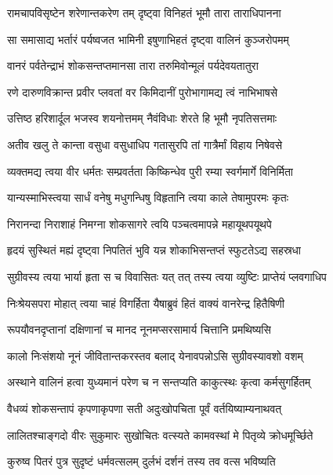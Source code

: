 
\twolineshloka
{रामचापविसृष्टेन शरेणान्तकरेण तम्}
{दृष्ट्वा विनिहतं भूमौ तारा ताराधिपानना} %

\twolineshloka
{सा समासाद्य भर्तारं पर्यष्वजत भामिनी}
{इषुणाभिहतं दृष्ट्वा वालिनं कुञ्जरोपमम्} %

\twolineshloka
{वानरं पर्वतेन्द्राभं शोकसन्तप्तमानसा}
{तारा तरुमिवोन्मूलं पर्यदेवयतातुरा} %

\twolineshloka
{रणे दारुणविक्रान्त प्रवीर प्लवतां वर}
{किमिदानीं पुरोभागामद्य त्वं नाभिभाषसे} %

\twolineshloka
{उत्तिष्ठ हरिशार्दूल भजस्व शयनोत्तमम्}
{नैवंविधाः शेरते हि भूमौ नृपतिसत्तमाः} %

\twolineshloka
{अतीव खलु ते कान्ता वसुधा वसुधाधिप}
{गतासुरपि तां गात्रैर्मां विहाय निषेवसे} %

\twolineshloka
{व्यक्तमद्य त्वया वीर धर्मतः सम्प्रवर्तता}
{किष्किन्धेव पुरी रम्या स्वर्गमार्गे विनिर्मिता} %

\twolineshloka
{यान्यस्माभिस्त्वया सार्धं वनेषु मधुगन्धिषु}
{विहृतानि त्वया काले तेषामुपरमः कृतः} %

\twolineshloka
{निरानन्दा निराशाहं निमग्ना शोकसागरे}
{त्वयि पञ्चत्वमापन्ने महायूथपयूथपे} %

\twolineshloka
{हृदयं सुस्थितं मह्यं दृष्ट्वा निपतितं भुवि}
{यन्न शोकाभिसन्तप्तं स्फुटतेऽद्य सहस्रधा} %

\twolineshloka
{सुग्रीवस्य त्वया भार्या हृता स च विवासितः}
{यत् तत् तस्य त्वया व्युष्टिः प्राप्तेयं प्लवगाधिप} %

\twolineshloka
{निःश्रेयसपरा मोहात् त्वया चाहं विगर्हिता}
{यैषाब्रुवं हितं वाक्यं वानरेन्द्र हितैषिणी} %

\twolineshloka
{रूपयौवनदृप्तानां दक्षिणानां च मानद}
{नूनमप्सरसामार्य चित्तानि प्रमथिष्यसि} %

\twolineshloka
{कालो निःसंशयो नूनं जीवितान्तकरस्तव}
{बलाद् येनावपन्नोऽसि सुग्रीवस्यावशो वशम्} %

\twolineshloka
{अस्थाने वालिनं हत्वा युध्यमानं परेण च}
{न सन्तप्यति काकुत्स्थः कृत्वा कर्मसुगर्हितम्} %

\twolineshloka
{वैधव्यं शोकसन्तापं कृपणाकृपणा सती}
{अदुःखोपचिता पूर्वं वर्तयिष्याम्यनाथवत्} %

\twolineshloka
{लालितश्चाङ्गदो वीरः सुकुमारः सुखोचितः}
{वत्स्यते कामवस्थां मे पितृव्ये क्रोधमूर्च्छिते} %

\twolineshloka
{कुरुष्व पितरं पुत्र सुदृष्टं धर्मवत्सलम्}
{दुर्लभं दर्शनं तस्य तव वत्स भविष्यति} %

